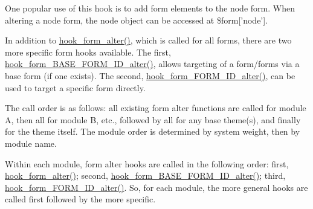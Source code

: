 One popular use of this hook is to add form elements to the node form. When altering a node form, the node object can be accessed at \$form\mbox{[}'node'\mbox{]}.

In addition to \hyperlink{group__hooks_ga6df3cea27ae1407aeef4eae5444cb213}{hook\_\-form\_\-alter()}, which is called for all forms, there are two more specific form hooks available. The first, \hyperlink{group__hooks_gaf0cfc224a88c8823da68856c30a4841a}{hook\_\-form\_\-BASE\_\-FORM\_\-ID\_\-alter()}, allows targeting of a form/forms via a base form (if one exists). The second, \hyperlink{group__hooks_ga8d4a4089551493d55911bd5c4f218264}{hook\_\-form\_\-FORM\_\-ID\_\-alter()}, can be used to target a specific form directly.

The call order is as follows: all existing form alter functions are called for module A, then all for module B, etc., followed by all for any base theme(s), and finally for the theme itself. The module order is determined by system weight, then by module name.

Within each module, form alter hooks are called in the following order: first, \hyperlink{group__hooks_ga6df3cea27ae1407aeef4eae5444cb213}{hook\_\-form\_\-alter()}; second, \hyperlink{group__hooks_gaf0cfc224a88c8823da68856c30a4841a}{hook\_\-form\_\-BASE\_\-FORM\_\-ID\_\-alter()}; third, \hyperlink{group__hooks_ga8d4a4089551493d55911bd5c4f218264}{hook\_\-form\_\-FORM\_\-ID\_\-alter()}. So, for each module, the more general hooks are called first followed by the more specific.


